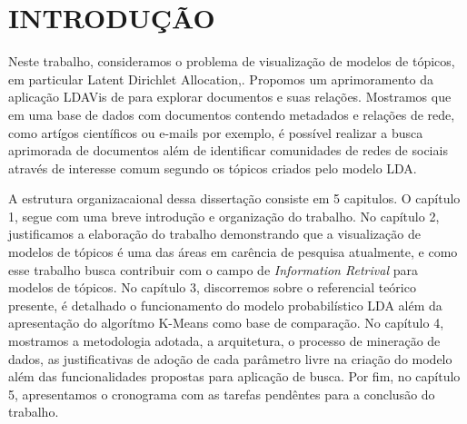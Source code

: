 \documentclass[12pt,a4paper]{article}
\begin{document}
\newpage
\pagestyle{plain}
\renewcommand{\baselinestretch}{1.5}
\normalsize
\section{INTRODUÇÃO}
 Neste trabalho, consideramos o problema de visualização de modelos de tópicos, em particular Latent Dirichlet Allocation,\cite{blei2003latent}.
 Propomos um aprimoramento da aplicação LDAVis de  para explorar documentos e suas relações. Mostramos que em uma base de dados
 com documentos contendo metadados e relações de rede, como artígos científicos ou e-mails por exemplo, é possível realizar a busca aprimorada de documentos além de identificar
 comunidades de redes de sociais através de interesse comum segundo os tópicos criados pelo modelo LDA.

 A estrutura organizacaional dessa dissertação consiste em 5 capitulos. O capítulo 1, segue com uma breve introdução e organização do trabalho. 
  No capítulo 2, justificamos a elaboração do trabalho demonstrando que a visualização de modelos de tópicos é uma das áreas em carência de pesquisa atualmente, 
  e como esse trabalho busca contribuir com o campo de \textit{Information Retrival} para modelos de tópicos. No capítulo 3, discorremos sobre o referencial teórico presente, 
  é detalhado o funcionamento do modelo probabilístico LDA além da apresentação do algorítmo K-Means como base de comparação. No capítulo 4, mostramos a metodologia adotada, 
  a arquitetura, o processo de mineração de dados, as justificativas de adoção de cada parâmetro livre na criação do modelo além das funcionalidades propostas para
  aplicação de busca. Por fim, no capítulo 5, apresentamos o cronograma com as tarefas pendêntes para a conclusão do trabalho.


\end{document}

